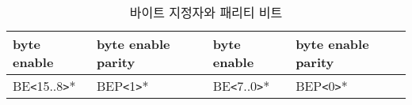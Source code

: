 %
%
\begin{table}[htbp]
\caption{바이트 지정자와 패리티 비트}
   \begin{center}
   \begin{tabular}{|l|l||l|l|} \hline
      byte enable & byte enable parity & byte enable & byte enable parity \\ \hline \hline
      BE{\tt <}15..8{\tt >}* & BEP{\tt <}1{\tt >}* &
      BE{\tt <}7..0{\tt >}* & BEP{\tt <}0{\tt >}* \\ \hline
   \end{tabular}
   \end{center}
\end{table}
%
%
